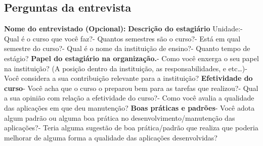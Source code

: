 \begin{anexosenv}

\partanexos

\chapter{Perguntas da entrevista}

\textbf{Nome do entrevistado (Opcional):}\newline\newline
\textbf{Descrição do estagiário}\newline\newline
Unidade:- Qual é o curso que você faz?- Quantos semestres são o curso?- Está em qual semestre do curso?- Qual é o nome da instituição de ensino?- Quanto tempo de estágio?\newline
\newline
\textbf{Papel do estagiário na organização.}\newline{}- Como você enxerga o seu papel na instituição? (A posição dentro da instituição, as responsabilidades, e etc…)- Você considera a sua contribuição relevante para a instituição?\newline
    \newline
\textbf{Efetividade do curso}\newline{}- Você acha que o curso o preparou bem para as tarefas que realizou?- Qual a sua opinião com relação a efetividade do curso?- Como você avalia a qualidade das aplicações em que deu manutenção?\newline
\newline
\textbf{Boas práticas e padrões}\newline{}- Você adota algum padrão ou alguma boa prática no desenvolvimento/manutenção das aplicações?- Teria alguma sugestão de boa prática/padrão que realiza que poderia melhorar de alguma forma a qualidade das aplicações desenvolvidas?\newline

\end{anexosenv}
